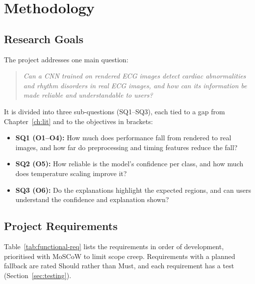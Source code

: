 \chapter{Methodology}
\label{ch:method}

\section{Research Goals}
\label{sec:goals}
The project addresses one main question:
\begin{quote}
\emph{Can a CNN trained on rendered ECG images detect cardiac abnormalities and rhythm disorders in real ECG images, and how can its information be made reliable and understandable to users?}
\end{quote}
It is divided into three sub-questions (SQ1--SQ3), each tied to a gap from Chapter~\ref{ch:lit} and to the objectives in brackets:
\begin{itemize}
  \item \textbf{SQ1 (O1--O4):} How much does performance fall from rendered to real images, and how far do preprocessing and timing features reduce the fall?
  \item \textbf{SQ2 (O5):} How reliable is the model's confidence per class, and how much does temperature scaling improve it?
  \item \textbf{SQ3 (O6):} Do the explanations highlight the expected regions, and can users understand the confidence and explanation shown?
\end{itemize}

\section{Project Requirements}
\label{sec:requirements}
Table~\ref{tab:functional-req} lists the requirements in order of development, prioritised with MoSCoW to limit scope creep. Requirements with a planned fallback are rated Should rather than Must, and each requirement has a test (Section~\ref{sec:testing}).


